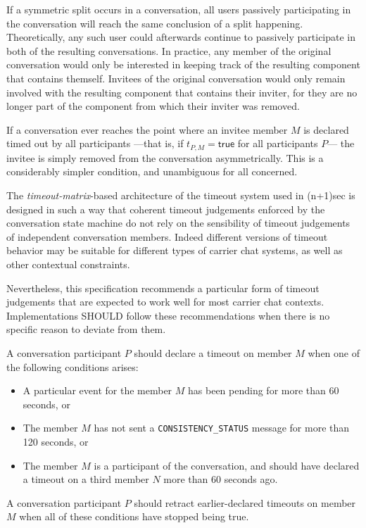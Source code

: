 \documentclass{article}
\def\npmessage#1{\texttt{#1}}
\def\smfield#1{\textsl{#1}}
\begin{document}
If a symmetric split occurs in a conversation, all users passively participating in the conversation will reach the same conclusion of a split happening.
Theoretically, any such user could afterwards continue to passively participate in both of the resulting conversations.
In practice, any member of the original conversation would only be interested in keeping track of the resulting component that contains themself.
Invitees of the original conversation would only remain involved with the resulting component that contains their inviter, for they are no longer part of the component from which their inviter was removed.

If a conversation ever reaches the point where an invitee member $M$ is declared timed out by all participants ---that is, if $t_{P, M} = \textsf{true}$ for all participants $P$--- the invitee is simply removed from the conversation asymmetrically.
This is a considerably simpler condition, and unambiguous for all concerned.


The \smfield{timeout-matrix}-based architecture of the timeout system used in (n+1)sec is designed in such a way that coherent timeout judgements enforced by the conversation state machine do not rely on the sensibility of timeout judgements of independent conversation members.
Indeed different versions of timeout behavior may be suitable for different types of carrier chat systems, as well as other contextual constraints.

Nevertheless, this specification recommends a particular form of timeout judgements that are expected to work well for most carrier chat contexts.
Implementations SHOULD follow these recommendations when there is no specific reason to deviate from them.

A conversation participant $P$ should declare a timeout on member $M$ when one of the following conditions arises:
\begin{itemize}
\item A particular event for the member $M$ has been pending for more than 60 seconds, or
\item The member $M$ has not sent a \npmessage{CONSISTENCY\_STATUS} message for more than 120 seconds, or
\item The member $M$ is a participant of the conversation, and should have declared a timeout on a third member $N$ more than 60 seconds ago.
\end{itemize}
A conversation participant $P$ should retract earlier-declared timeouts on member $M$ when all of these conditions have stopped being true.
\end{document}
